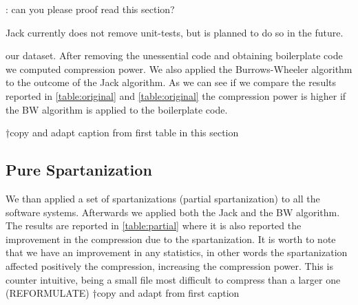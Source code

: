 \matteo: can  you please proof read this section?

Jack currently does not remove unit-tests, but is planned to do so in the
future.

 our dataset. After removing the unessential code and
obtaining boilerplate code we computed compression power. We also applied the
Burrows-Wheeler algorithm to the outcome of the Jack algorithm. As we can see
if we compare the results reported in \cref{table:original} and
\cref{table:original} the compression power is higher if the BW algorithm is
applied to the boilerplate code.

\matteo†{copy and adapt caption from first table in this section}

\begin{table}
  \caption{The results of the compression using the Jack algorithm alone and
  both Jack and Burrows-Wheeler algorithms combined}
  \label{table:original}
  \par\vspace{10pt plus 6pt minus 4pt}
  \centering
\end{table}

\subsection{Pure Spartanization}

We than applied a set of spartanizations (partial spartanization) to all the
software systems. Afterwards we applied both the Jack and the BW algorithm.
The results are reported in \cref{table:partial} where it is also
reported the improvement in the compression due to the spartanization. It is
worth to note that we have an improvement in any statistics, in other words the
spartanization affected positively the compression, increasing the compression
power. This is counter intuitive, being a small file most difficult to
compress than a larger one (REFORMULATE)
\matteo†{copy and adapt from first caption}


